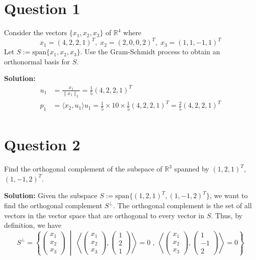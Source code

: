 \documentclass{article}
\begin{document}
\section*{Question 1}
Consider the vectors $\{x_1, x_2, x_3\}$ of $\mathbb{R}^4$ where
$$ x_1 = (4, 2, 2, 1)^T, \; x_2 = (2, 0, 0, 2)^T, \; x_3 = (1, 1, -1 ,1)^T $$
Let $S := \text{span} \{x_1, x_2, x_3\}$.
Use the Gram-Schmidt process to obtain an orthonormal basis for $S$.

\vspace{0.5cm}
\noindent\textbf{Solution:}
\begin{align*}
    u_1 &= \frac{x_1}{\|x_1\|_2} = \frac{1}{5} (4, 2, 2, 1)^T \\
    p_1 &= \langle x_2, u_1 \rangle u_1 = \frac{1}{5} \times 10 \times \frac{1}{5} (4, 2, 2, 1)^T = \frac{2}{5} (4, 2, 2, 1)^T \\
\end{align*}

\section*{Question 2}
Find the orthogonal complement of the subspace of $\mathbb{R}^3$ spanned by $(1, 2, 1)^T$, $(1, -1, 2)^T$.

\vspace{0.5cm}
\noindent\textbf{Solution:}
Given the subspace $S := \text{span} \{(1, 2, 1)^T, (1, -1, 2)^T\}$, we want to find the orthogonal complement $S^\perp$.
The orthogonal complement is the set of all vectors in the vector space that are orthogonal to every vector in $S$.
Thus, by definition, we have
$$ S^\perp = \left\{
    \begin{pmatrix} x_1 \\ x_2 \\ x_3 \end{pmatrix} 
    \; \middle| \; 
    \left\langle \begin{pmatrix} x_1 \\ x_2 \\ x_3 \end{pmatrix}, \begin{pmatrix} 1 \\ 2 \\ 1 \end{pmatrix} \right\rangle = 0 
    \; , \; 
    \left\langle \begin{pmatrix} x_1 \\ x_2 \\ x_3 \end{pmatrix}, \begin{pmatrix} 1 \\ -1 \\ 2 \end{pmatrix} \right\rangle = 0
\right\} $$
\end{document}
